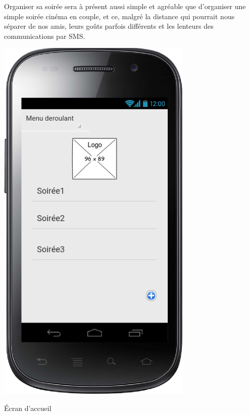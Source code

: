 \documentclass[a4paper, 12pt, notitlepage]{article} %
\begin{document}
Organiser sa soirée sera à présent aussi simple et agréable que d'organiser une simple soirée cinéma en couple, et ce, malgré la distance qui pourrait nous séparer de nos amis, leurs goûts parfois différents et les lenteurs des communications par SMS.
\newpage


\begin{maquetteFig}[!htb]
  \centering
  \includegraphics[width=0.7\textwidth]{accueil.png}
  \caption{Écran d'accueil}
  \label{Maquette:Accueil}
\end{maquetteFig}
\end{document}
